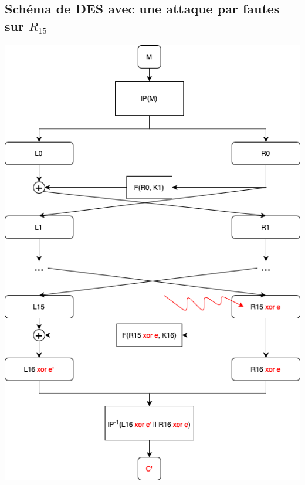 \documentclass[10pt,a4paper]{article}
\begin{document}
\subsection{Schéma de DES avec une attaque par fautes sur $R_{15}$}
\label{schema 2}
 \begin{center}
\includegraphics[scale=0.8]{../schemas/Schema_DES_attaque_faute.png}
 \end{center}

\newpage
\end{document}
